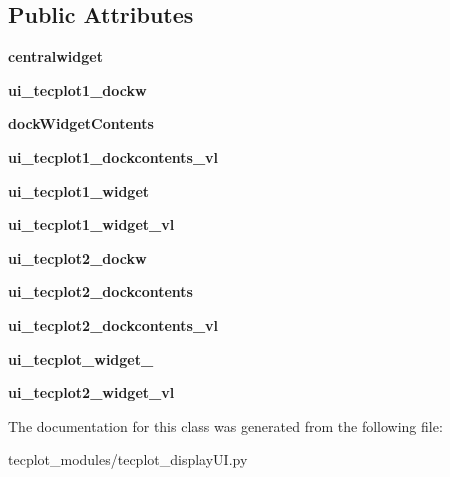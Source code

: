 \subsection*{Public Attributes}
\begin{DoxyCompactItemize}
\item 
\hypertarget{a00115_a8806355d8f5b1e79e73c21d82b2a02b1}{}\label{a00115_a8806355d8f5b1e79e73c21d82b2a02b1} 
{\bfseries centralwidget}
\item 
\hypertarget{a00115_a5bc16af243ddcb715ac4dca3eaeea83f}{}\label{a00115_a5bc16af243ddcb715ac4dca3eaeea83f} 
{\bfseries ui\+\_\+tecplot1\+\_\+dockw}
\item 
\hypertarget{a00115_a5f2617d5cf96b7f5c5eab71716630e9f}{}\label{a00115_a5f2617d5cf96b7f5c5eab71716630e9f} 
{\bfseries dock\+Widget\+Contents}
\item 
\hypertarget{a00115_a669ef5be286de5a4683863273aea2117}{}\label{a00115_a669ef5be286de5a4683863273aea2117} 
{\bfseries ui\+\_\+tecplot1\+\_\+dockcontents\+\_\+vl}
\item 
\hypertarget{a00115_a0e12cc099f3392ddc5763b2e11735c65}{}\label{a00115_a0e12cc099f3392ddc5763b2e11735c65} 
{\bfseries ui\+\_\+tecplot1\+\_\+widget}
\item 
\hypertarget{a00115_a29ec621d9a4d64b9ac2741603bfd4c0b}{}\label{a00115_a29ec621d9a4d64b9ac2741603bfd4c0b} 
{\bfseries ui\+\_\+tecplot1\+\_\+widget\+\_\+vl}
\item 
\hypertarget{a00115_a39ab796d26cd8af1d7b08a1af13f18d3}{}\label{a00115_a39ab796d26cd8af1d7b08a1af13f18d3} 
{\bfseries ui\+\_\+tecplot2\+\_\+dockw}
\item 
\hypertarget{a00115_afcc75b6eb098b33d244b16c759c2b0fd}{}\label{a00115_afcc75b6eb098b33d244b16c759c2b0fd} 
{\bfseries ui\+\_\+tecplot2\+\_\+dockcontents}
\item 
\hypertarget{a00115_a8883278a682ade2e54c270ba2064a3d8}{}\label{a00115_a8883278a682ade2e54c270ba2064a3d8} 
{\bfseries ui\+\_\+tecplot2\+\_\+dockcontents\+\_\+vl}
\item 
\hypertarget{a00115_adf880d85360d7fc4761f74c7ab80e09f}{}\label{a00115_adf880d85360d7fc4761f74c7ab80e09f} 
{\bfseries ui\+\_\+tecplot\+\_\+widget\+\_}
\item 
\hypertarget{a00115_a3b0bcb24fdafc82b684e59b018c76ba9}{}\label{a00115_a3b0bcb24fdafc82b684e59b018c76ba9} 
{\bfseries ui\+\_\+tecplot2\+\_\+widget\+\_\+vl}
\end{DoxyCompactItemize}


The documentation for this class was generated from the following file\+:\begin{DoxyCompactItemize}
\item 
tecplot\+\_\+modules/tecplot\+\_\+display\+U\+I.\+py\end{DoxyCompactItemize}
